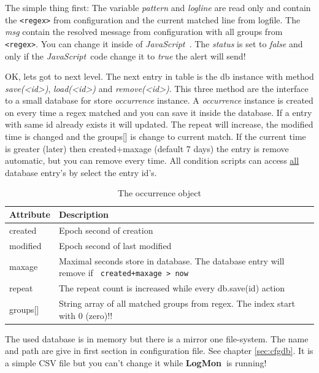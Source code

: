 \documentclass[11pt,a4paper]{article}
\newcommand{\logmon}{\textbf{LogMon\ }}
\newcommand{\js}{\textit{JavaScript\ }}
\begin{document}
The simple thing first: The variable \textit{pattern} and \textit{logline}
are read only and contain the \verb#<regex># from configuration and the
current matched line from logfile. The \textit{msg} contain the resolved
message from configuration with all groups from \verb#<regex>#. You
can change it inside of \js. The \textit{status} is set to \textit{false}
and only if the \js code change it to \textit{true} the alert will send!

OK, lets got to next level. The next entry in table is the db instance
with method \textit{save(\textless{}id\textgreater{})}, \textit{load(\textless{}id\textgreater{})}
and \textit{remove(\textless{}id\textgreater{})}. This three method are the interface to
a small database for store \textit{occurrence} instance. A \textit{occurrence} instance is created
on every time a regex matched and you can save it inside the database. If a entry with same
 id already exists it will updated. The repeat will increase, the modified time is changed and
 the groups[] is change to current match. If the current time is greater (later) then
 created+maxage (default 7 days) the entry is remove automatic, but you can remove every time.
 All condition scripts can access \underline{all} database entry's by select the
 entry id's.

\begin{table}[ht]
\begin{tabular}{l|p{}}
  Attribute & Description\\\hline\hline
  created   & Epoch second of creation\\\hline
  modified  & Epoch second of last modified\\\hline

  maxage    & Maximal seconds store in database. The database entry will remove
  if \verb# created+maxage > now#\\\hline

  repeat    & The repeat count is increased while every db.save(id)
  action\\\hline

  groups[]  & String array of all matched groups from regex. The index start
  with 0 (zero)!!\\\hline
\end{tabular}
\caption{The occurrence object}
\label{tab:occurr}
\end{table}

The used database is in memory but there is a mirror one file-system. The name and path are give in first
section in configuration file. See chapter \ref{sec:cfgdb}. It is a simple CSV file but you can't change
it while \logmon is running!
\end{document}
